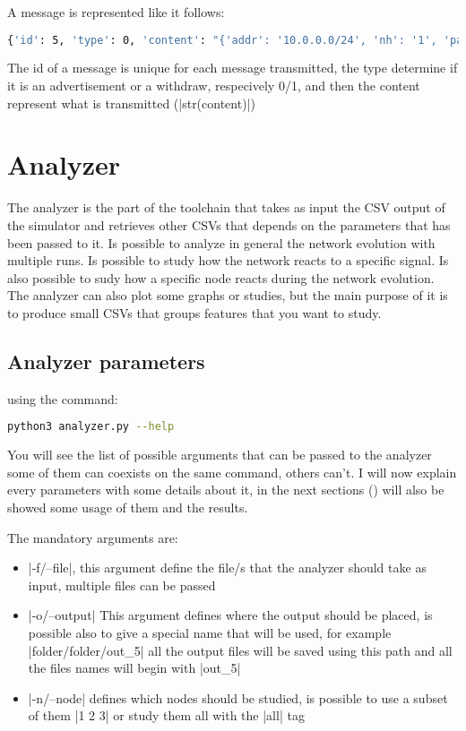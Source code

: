 \documentclass[10pt,journal,onecolumn]{IEEEtran}
\begin{document}
A message is represented like it follows:
\begin{lstlisting}[language=bash]
{'id': 5, 'type': 0, 'content': "{'addr': '10.0.0.0/24', 'nh': '1', 'path': ['1', '0_1', '0'], 'policy_value': '0'}"}
\end{lstlisting}
The id of a message is unique for each message transmitted, the type determine if it
is an advertisement or a withdraw, respecively \num{0}/\num{1}, and then 
the content represent what is transmitted (|str(content)|)

\section{Analyzer}
\label{sec:analyzer}

The analyzer is the part of the toolchain that takes as input the CSV output of
the simulator and retrieves other CSVs that depends on the parameters that has
been passed to it.
Is possible to analyze in general the network evolution with multiple runs.
Is possible to study how the network reacts to a specific signal.
Is also possible to sudy how a specific node reacts during the network evolution.
The analyzer can also plot some graphs or studies, but the main purpose of it 
is to produce small CSVs that groups features that you want to study.

\subsection{Analyzer parameters}
\label{subsec:anal_param}

using the command:
\begin{lstlisting}[language=bash]
python3 analyzer.py --help
\end{lstlisting}
You will see the list of possible arguments that can be passed to the analyzer
some of them can coexists on the same command, others can't.
I will now explain every parameters with some details about it, in the next
sections () will also be showed some
usage of them and the results.

The mandatory arguments are:
\begin{itemize}
	\item |-f/--file|, this argument define the file/s that the analyzer
		should take as input, multiple files can be passed
	\item |-o/--output| This argument defines where the output should
		be placed, is possible also to give a special name that will be used,
		for example |folder/folder/out_5| all the output files will be saved
		using this path and all the files names will begin with |out_5|
	\item |-n/--node| defines which nodes should be studied, is possible
		to use a subset of them |1 2 3| or study them all with the |all| tag
\end{itemize}
\end{document}
